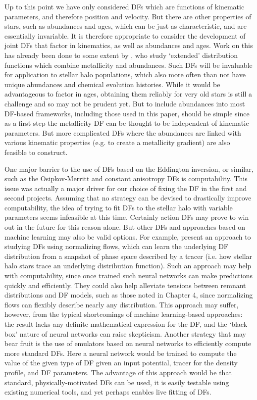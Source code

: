 Up to this point we have only considered DFs which are functions of kinematic parameters, and therefore position and velocity. But there are other properties of stars, such as abundances and ages, which can be just as characteristic, and are essentially invariable. It is therefore appropriate to consider the development of joint DFs that factor in kinematics, as well as abundances and ages. Work on this has already been done to some extent by \textcite{sanders15b}, who study `extended' distribution functions which combine metallicity and abundances. Such DFs will be invaluable for application to stellar halo populations, which also more often than not have unique abundances and chemical evolution histories. While it would be advantageous to factor in ages, obtaining them reliably for very old stars is still a challenge and so may not be prudent yet. But to include abundances into most DF-based frameworks, including those used in this paper, should be simple since as a first step the metallicity DF can be thought to be independent of kinematic parameters. But more complicated DFs where the abundances are linked with various kinematic properties (e.g. to create a metallicity gradient) are also feasible to construct.

One major barrier to the use of DFs based on the Eddington inversion, or similar, such as the Osipkov-Merritt and constant anisotropy DFs is computability. This issue was actually a major driver for our choice of fixing the DF in the first and second projects. Assuming that no strategy can be devised to drastically improve computability, the idea of trying to fit DFs to the stellar halo with variable parameters seems infeasible at this time. Certainly action DFs may prove to win out in the future for this reason alone. But other DFs and approaches based on machine learning may also be valid options. For example, \textcite{green23} present an approach to studying DFs using normalizing flows, which can learn the underlying DF distribution from a snapshot of phase space described by a tracer (i.e. how stellar halo stars trace an underlying distribution function). Such an approach may help with computability, since once trained such neural networks can make predictions quickly and efficiently. They could also help alleviate tensions between remnant distributions and DF models, such as those noted in Chapter 4, since normalizing flows can flexibly describe nearly any distribution. This approach may suffer, however, from the typical shortcomings of machine learning-based approaches: the result lacks any definite mathematical expression for the DF, and the `black box' nature of neural networks can raise skepticism. Another strategy that may bear fruit is the use of emulators based on neural networks to efficiently compute more standard DFs. Here a neural network would be trained to compute the value of the given type of DF given an input potential, tracer for the density profile, and DF parameters. The advantage of this approach would be that standard, physically-motivated DFs can be used, it is easily testable using existing numerical tools, and yet perhaps enables live fitting of DFs.

